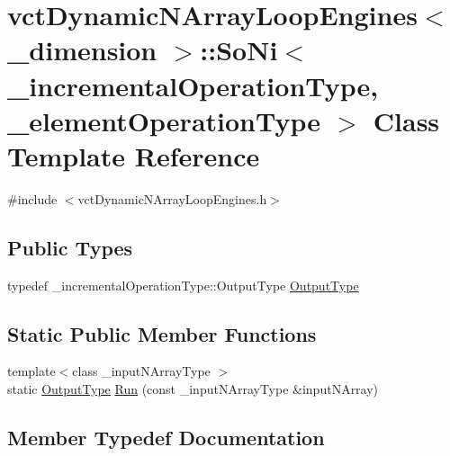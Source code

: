 \hypertarget{classvct_dynamic_n_array_loop_engines_1_1_so_ni}{}\section{vct\+Dynamic\+N\+Array\+Loop\+Engines$<$ \+\_\+dimension $>$\+:\+:So\+Ni$<$ \+\_\+incremental\+Operation\+Type, \+\_\+element\+Operation\+Type $>$ Class Template Reference}
\label{classvct_dynamic_n_array_loop_engines_1_1_so_ni}


{\ttfamily \#include $<$vct\+Dynamic\+N\+Array\+Loop\+Engines.\+h$>$}

\subsection*{Public Types}
\begin{DoxyCompactItemize}
\item 
typedef \+\_\+incremental\+Operation\+Type\+::\+Output\+Type \hyperlink{classvct_dynamic_n_array_loop_engines_1_1_so_ni_a53b13177ad4d406a426f32d72f109ab8}{Output\+Type}
\end{DoxyCompactItemize}
\subsection*{Static Public Member Functions}
\begin{DoxyCompactItemize}
\item 
{\footnotesize template$<$class \+\_\+input\+N\+Array\+Type $>$ }\\static \hyperlink{classvct_dynamic_n_array_loop_engines_1_1_so_ni_a53b13177ad4d406a426f32d72f109ab8}{Output\+Type} \hyperlink{classvct_dynamic_n_array_loop_engines_1_1_so_ni_a90941b9548b4ec0e3df543ae8e746dea}{Run} (const \+\_\+input\+N\+Array\+Type \&input\+N\+Array)
\end{DoxyCompactItemize}


\subsection{Member Typedef Documentation}
\hypertarget{classvct_dynamic_n_array_loop_engines_1_1_so_ni_a53b13177ad4d406a426f32d72f109ab8}{}
